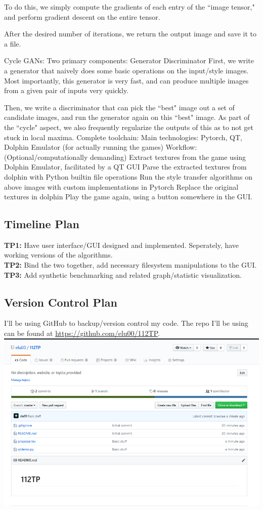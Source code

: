 \documentclass[12pt]{article}
\begin{document}
    To do this, we simply compute the gradients of each entry of the ``image tensor," and perform gradient descent on the entire tensor. 

    After the desired number of iterations, we return the output image and save it to a file.

    Cycle GANs:
    Two primary components:
    Generator 
    Discriminator
    First, we write a generator that naively does some basic operations on the input/style images. Most importantly, this generator is very fast, and can produce multiple images from a given pair of inputs very quickly. 

    Then, we write a discriminator that can pick the ``best" image out a set of candidate images, and run the generator again on this ``best" image. As part of the ``cycle" aspect, we also frequently regularize the outputs of this as to not get stuck in local maxima. 
    Complete toolchain:
    Main technologies: Pytorch, QT, Dolphin Emulator (for actually running the games)
    Workflow: 
    (Optional/computationally demanding) Extract textures from the game using Dolphin Emulator, facilitated by a QT GUI
    Parse the extracted textures from dolphin with Python builtin file operations
    Run the style transfer algorithms on above images with custom implementations in Pytorch
    Replace the original textures in dolphin
    Play the game again, using a button somewhere in the GUI.

\subsection{Timeline Plan}
    \textbf{TP1:} Have user interface/GUI designed and implemented. Seperately, have working versions of the algorithms.\\
    \textbf{TP2:} Bind the two together, add necessary filesystem manipulations to the GUI.\\
    \textbf{TP3:} Add synthetic benchmarking and related graph/statistic visualization.\\
\subsection{Version Control Plan}
    I'll be using GitHub to backup/version control my code. 
    The repo I'll be using can be found at \href{https://github.com/elu00/112TP}{https://github.com/elu00/112TP}. \\
    \includegraphics[scale=0.8]{screenshot.png}
\end{document}
